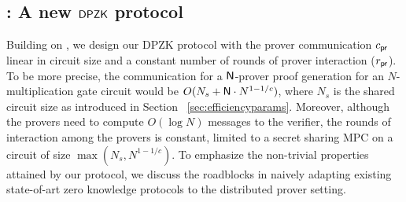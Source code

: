 \subsection{\dpname: A new $\mathsf{DPZK}$ protocol}
Building on \name{}, we design our DPZK protocol \dpname{} with the prover
communication $c_\mathsf{pr}$ linear in circuit size and a constant number of rounds
of prover interaction ($r_\mathsf{pr}$). To be more precise, the communication for a
$\mathsf{N}$-prover proof generation for an $N$-multiplication gate circuit 
would be $O(N_s + \mathsf{N} \cdot N^{1-1/c})$, where
$N_s$ is the shared circuit size as introduced in Section
~\ref{sec:efficiencyparams}. Moreover, although the provers need to
compute $O(\log{N})$ messages to the verifier, the rounds of interaction 
among the provers is constant, limited to a secret sharing MPC on a circuit
of size $\max(N_s,N^{1-1/c})$. To emphasize the non-trivial properties attained
by our protocol, we discuss the roadblocks in naively adapting existing
state-of-art zero knowledge protocols to the distributed prover
setting.\smallskip

